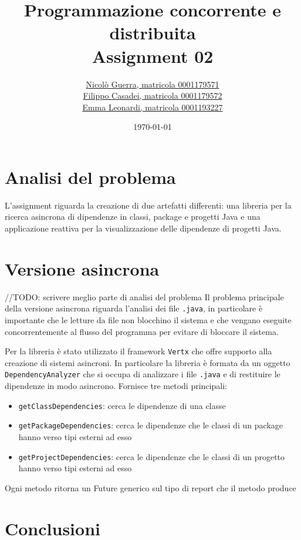 \documentclass[11pt,notitlepage]{article}
\title{Programmazione concorrente e distribuita \\ Assignment 02}
\author{
    \href{mailto:nicolo.guerra@studio.unibo.it}{Nicolò Guerra, matricola 0001179571} \\
    \href{mailto:filippo.casadei9@studio.unibo.it}{Filippo Casadei, matricola 0001179572} \\
    \href{mailto:emma.leonardi2@studio.unibo.it}{Emma Leonardi, matricola 0001193227}
    }
\date{\today}
\begin{document}
\maketitle
\renewcommand{\thesection}{\arabic{section}}
\section{Analisi del problema}

L'assignment riguarda la creazione di due artefatti differenti: una libreria per la ricerca asincrona di dipendenze in classi, package e progetti Java e una applicazione
reattiva per la visualizzazione delle dipendenze di progetti Java.

\section{Versione asincrona}
//TODO: scrivere meglio parte di analisi del problema
Il problema principale della versione asincrona riguarda l'analisi dei file \texttt{.java}, in particolare è importante che le letture da file non blocchino il sistema e che vengano
eseguite concorrentemente al flusso del programma per evitare di bloccare il sistema.

Per la libreria è stato utilizzato il framework \texttt{Vertx} che offre supporto alla creazione di sistemi asincroni. In particolare la libreria è formata da un oggetto 
\texttt{DependencyAnalyzer} che si occupa di analizzare i file \texttt{.java} e di restituire le dipendenze in modo asincrono. Fornisce tre metodi principali:
\begin{itemize}
    \item \texttt{getClassDependencies}: cerca le dipendenze di una classe
    \item \texttt{getPackageDependencies}: cerca le dipendenze che le classi di un package hanno verso tipi esterni ad esso
    \item \texttt{getProjectDependencies}: cerca le dipendenze che le classi di un progetto hanno verso tipi esterni ad esso
\end{itemize}
Ogni metodo ritorna un Future generico sul tipo di report che il metodo produce

\section{Conclusioni}
\end{document}
